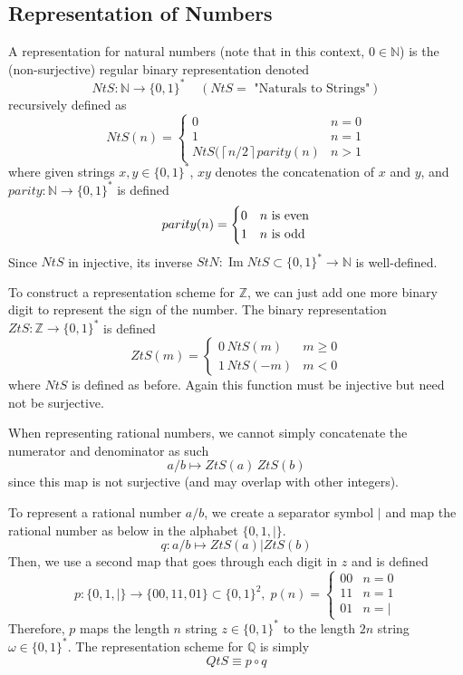 \documentclass{article}
\DeclareMathOperator{\im}{Im}
\begin{document}
  \subsection{Representation of Numbers}
  \begin{definition}
  A representation for natural numbers (note that in this context, $0 \in \mathbb{N}$) is the (non-surjective) regular binary representation denoted
  \[NtS: \mathbb{N} \longrightarrow \{0,1\}^* \;\;\;\; (NtS= \text{ "Naturals to Strings"})\]
  recursively defined as 
  \[NtS(n) = \begin{cases}
  0 & n = 0 \\
  1 & n = 1 \\
  NtS(\left \lceil{n/2}\right \rceil parity(n) & n > 1 
  \end{cases}\]
  where given strings $x, y \in \{0,1\}^*$, $xy$ denotes the concatenation of $x$ and $y$, and $parity: \mathbb{N} \longrightarrow \{0,1\}^*$ is defined 
  \[parity(n) = \begin{cases}
  0 & n $\text{ is even}$ \\
  1 & n $\text{ is odd}$
  \end{cases}\]
  Since $NtS$ in injective, its inverse $StN: \im{NtS} \subset \{0,1\}^* \longrightarrow \mathbb{N}$ is well-defined. 
  \end{definition}

  \begin{definition}
  To construct a representation scheme for $\mathbb{Z}$, we can just add one more binary digit to represent the sign of the number. The binary representation $ZtS: \mathbb{Z} \longrightarrow \{0, 1\}^*$ is defined
  \[ZtS(m) = \begin{cases}
  0\, NtS(m) & m \geq 0 \\
  1 \, NtS(-m) & m < 0
  \end{cases}\]
  where $NtS$ is defined as before. Again this function must be injective but need not be surjective. 
  \end{definition}

  When representing rational numbers, we cannot simply concatenate the numerator and denominator as such
  \[a/b \mapsto ZtS(a) \, ZtS(b)\]
  since this map is not surjective (and may overlap with other integers). 

  \begin{definition}
  To represent a rational number $a/b$, we create a separator symbol $|$ and map the rational number as below in the alphabet $\{0, 1, |\}$. 
  \[q: a/b \mapsto ZtS(a) | ZtS(b)\]
  Then, we use a second map that goes through each digit in $z$ and is defined 
  \[p: \{0, 1, |\} \longrightarrow \{00,11,01\} \subset \{0, 1\}^2, \; p(n) = \begin{cases}
  00 & n = 0 \\
  11 & n = 1 \\
  01 & n = |
  \end{cases}\]
  Therefore, $p$ maps the length $n$ string $z \in \{0, 1\}^*$ to the length $2n$ string $\omega \in \{0, 1\}^*$. The representation scheme for $\mathbb{Q}$ is simply 
  \[QtS \equiv p \circ q\]
  \end{definition}
\end{document}
